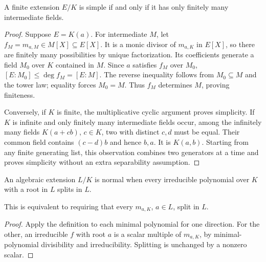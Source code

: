 \begin{theorem}
A finite extension $E/K$ is simple if and only if it has only finitely many intermediate fields.
\end{theorem}
\begin{proof}
Suppose $E=K(a)$. For intermediate $M$, let $f_M=m_{a,M}\in M[X]\subseteq E[X]$. It is a monic divisor of $m_{a,K}$ in $E[X]$, so there are finitely many possibilities by unique factorization. Its coefficients generate a field $M_0$ over $K$ contained in $M$. Since $a$ satisfies $f_M$ over $M_0$, $[E:M_0]\leq\deg f_M=[E:M]$. The reverse inequality follows from $M_0\subseteq M$ and the tower law; equality forces $M_0=M$. Thus $f_M$ determines $M$, proving finiteness.

Conversely, if $K$ is finite, the multiplicative cyclic argument proves simplicity. If $K$ is infinite and only finitely many intermediate fields occur, among the infinitely many fields $K(a+cb)$, $c\in K$, two with distinct $c,d$ must be equal. Their common field contains $(c-d)b$ and hence $b,a$. It is $K(a,b)$. Starting from any finite generating list, this observation combines two generators at a time and proves simplicity without an extra separability assumption.
\end{proof}

\begin{definition}
An algebraic extension $L/K$ is normal when every irreducible polynomial over $K$ with a root in $L$ splits in $L$.
\end{definition}
\begin{proposition}
This is equivalent to requiring that every $m_{a,K}$, $a\in L$, split in $L$.
\end{proposition}
\begin{proof}
Apply the definition to each minimal polynomial for one direction. For the other, an irreducible $f$ with root $a$ is a scalar multiple of $m_{a,K}$, by minimal-polynomial divisibility and irreducibility. Splitting is unchanged by a nonzero scalar.
\end{proof}

